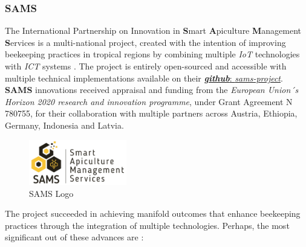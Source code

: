 \documentclass[12pt]{article}
\begin{document}
	\subsubsection{SAMS}
	The International Partnership on Innovation in \textbf{S}mart \textbf{A}piculture \textbf{M}anagement \textbf{S}ervices is a multi-national project, created with the intention of improving beekeeping practices in tropical regions by combining multiple \textit{IoT} technologies with\textit{ ICT} systems \cite{sams_project_overview}. The project is entirely open-sourced and accessible with multiple technical implementations available on their \href{https://github.com/sams-project}{\textbf{\textit{github}}: \textit{\small sams-project}}. \textbf{SAMS} innovations received appraisal and funding from the \textit{European Union´s Horizon 2020 research and innovation programme}{\footnotesize, under Grant Agreement N 780755,} for their collaboration with multiple partners across Austria, Ethiopia, Germany, Indonesia and Latvia.\\ \newline
	\begin{figure}[H]
		\centering
		\includegraphics[width=0.38\textwidth]{Images/Simillar/sams-logo.png}
		\caption{SAMS Logo \cite{sams_project}}
		\label{fig:SAMS_LOGO}
	\end{figure}
	\hspace{-0.62cm}The project succeeded in achieving manifold outcomes that enhance beekeeping practices through the integration of multiple technologies. Perhaps, the most significant out of these advances are \cite{sams_project_results} :
\end{document}
